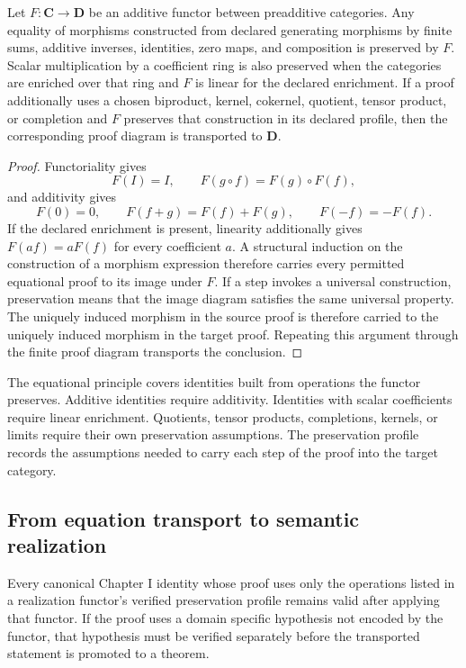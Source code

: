 \begin{theorem}
\label{thm:realization-export}
Let $F:\mathbf C\to\mathbf D$ be an additive functor between preadditive categories.  Any equality of morphisms constructed from declared generating morphisms by finite sums, additive inverses, identities, zero maps, and composition is preserved by $F$.  Scalar multiplication by a coefficient ring is also preserved when the categories are enriched over that ring and $F$ is linear for the declared enrichment.  If a proof additionally uses a chosen biproduct, kernel, cokernel, quotient, tensor product, or completion and $F$ preserves that construction in its declared profile, then the corresponding proof diagram is transported to $\mathbf D$.
\end{theorem}

\begin{proof}
Functoriality gives
\[
F(I)=I,
\qquad
F(g\circ f)=F(g)\circ F(f),
\]
and additivity gives
\[
F(0)=0,
\qquad
F(f+g)=F(f)+F(g),
\qquad
F(-f)=-F(f).
\]
If the declared enrichment is present, linearity additionally gives $F(af)=aF(f)$ for every coefficient $a$.  A structural induction on the construction of a morphism expression therefore carries every permitted equational proof to its image under $F$.  If a step invokes a universal construction, preservation means that the image diagram satisfies the same universal property.  The uniquely induced morphism in the source proof is therefore carried to the uniquely induced morphism in the target proof.  Repeating this argument through the finite proof diagram transports the conclusion.
\end{proof}

\begin{interpretation}
The equational principle covers identities built from operations the functor preserves.  Additive identities require additivity.  Identities with scalar coefficients require linear enrichment.  Quotients, tensor products, completions, kernels, or limits require their own preservation assumptions.  The preservation profile records the assumptions needed to carry each step of the proof into the target category.
\end{interpretation}


\subsection{From equation transport to semantic realization}
\begin{proposition}
\label{prop:realization-export}
Every canonical Chapter I identity whose proof uses only the operations listed in a realization functor's verified preservation profile remains valid after applying that functor.  If the proof uses a domain specific hypothesis not encoded by the functor, that hypothesis must be verified separately before the transported statement is promoted to a theorem.
\end{proposition}

